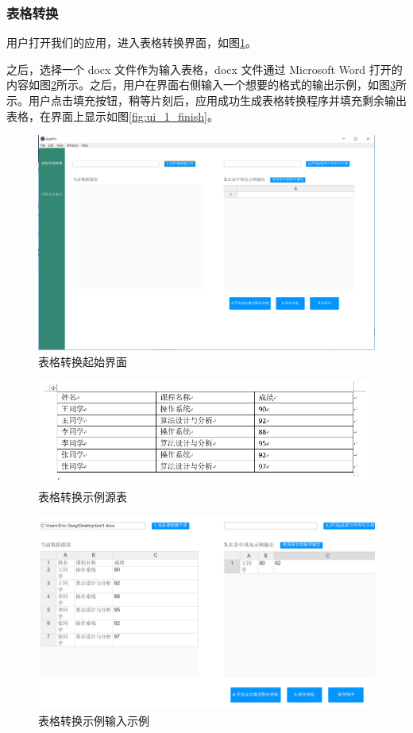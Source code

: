 \documentclass[design, pageheader]{njubachelor}
\begin{document}
\subsubsection{表格转换}
用户打开我们的应用，进入表格转换界面，如图\ref{fig:ui_1_init}。

之后，选择一个 docx 文件作为输入表格，docx 文件通过 Microsoft Word 打开的内容如图\ref{fig:docx_file}所示。之后，用户在界面右侧输入一个想要的格式的输出示例，如图\ref{fig:ui_1_input}所示。用户点击填充按钮，稍等片刻后，应用成功生成表格转换程序并填充剩余输出表格，在界面上显示如图\ref{fig:ui_1_finish}。
\begin{figure}
    \centering
    \includegraphics[width=15cm,keepaspectratio]{figures/ui_1_init.png}
    \caption{表格转换起始界面}
    \label{fig:ui_1_init}
\end{figure}
\begin{figure}
    \centering
    \includegraphics[width=15cm,keepaspectratio]{figures/docx_file.png}
    \caption{表格转换示例源表}
    \label{fig:docx_file}
\end{figure}
\begin{figure}
    \centering
    \includegraphics[width=15cm,keepaspectratio]{figures/ui_1_input.png}
    \caption{表格转换示例输入示例}
    \label{fig:ui_1_input}
\end{figure}
\end{document}
